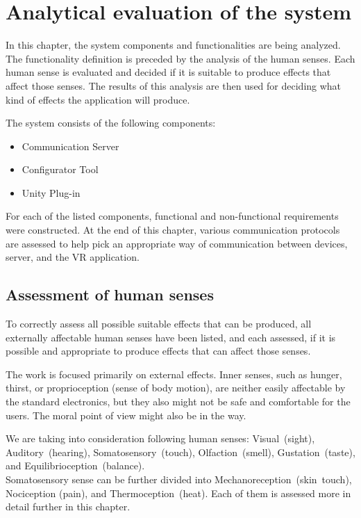 \chapter{Analytical evaluation of the system}

In this chapter, the system components and functionalities are being analyzed.
The functionality definition is preceded by the analysis of the human senses.
Each human sense is evaluated and decided if it is suitable to produce effects
that affect those senses. The results of this analysis are then used for
deciding what kind of effects the application will produce.


The system consists of the following components:


\begin{itemize}
  \itemsep0em
  \item Communication Server
  \item Configurator Tool
  \item Unity Plug-in
\end{itemize}


For each of the listed components, functional and non-functional requirements
were constructed. At the end of this chapter, various communication protocols
are assessed to help pick an appropriate way of communication between devices,
server, and the VR application.


\hypertarget{x-assessment-of-human-senses}{\section{Assessment of human senses}}
To correctly assess all possible suitable effects that can be produced, all 
externally affectable human senses have been listed, and each assessed,
if it is possible and appropriate to produce effects that can affect those senses.


The work is focused primarily on external effects. Inner senses, such as
hunger, thirst, or proprioception (sense of body motion), are neither
easily affectable by the standard electronics, but they also might not be safe
and comfortable for the users. The moral point of view
might also be in the way.

We are taking into consideration following human senses:
Visual~(sight), Auditory~(hearing), Somatosensory~(touch), Olfaction~(smell),
Gustation~(taste), and Equilibrioception~(balance). \\
Somatosensory sense can
be further divided into Mechanoreception~(skin~touch), Nociception (pain), and
Thermoception~(heat). Each of them is assessed more in detail further in this
chapter.


